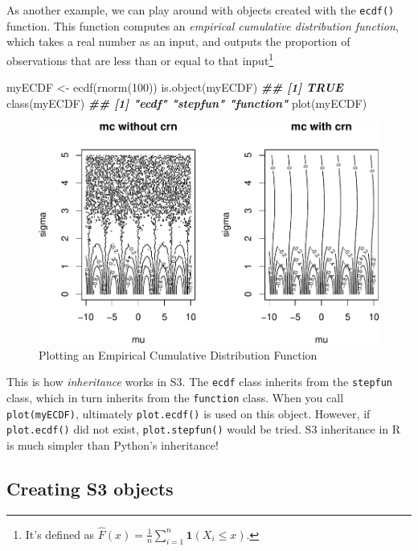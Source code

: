 \documentclass[
  12pt,
  krantz2]{krantz}
\makeatletter
\newenvironment{Shaded}{\begin{snugshade}}{\end{snugshade}}
\newcommand{\DecValTok}[1]{\textcolor[rgb]{0.06,0.06,0.06}{#1}}
\newcommand{\DocumentationTok}[1]{\textcolor[rgb]{0.37,0.37,0.37}{\textbf{\textit{#1}}}}
\newcommand{\FunctionTok}[1]{\textcolor[rgb]{0,0,0}{#1}}
\newcommand{\NormalTok}[1]{#1}
\newcommand{\OtherTok}[1]{\textcolor[rgb]{0.37,0.37,0.37}{#1}}
\newenvironment{kframe}{%
\medskip{}
\setlength{\fboxsep}{.8em}
 \def\at@end@of@kframe{}%
 \ifinner\ifhmode%
  \def\at@end@of@kframe{\end{minipage}}%
  \begin{minipage}{\columnwidth}%
 \fi\fi%
 \def\FrameCommand##1{\hskip\@totalleftmargin \hskip-\fboxsep
 \colorbox{shadecolor}{##1}\hskip-\fboxsep
     \hskip-\linewidth \hskip-\@totalleftmargin \hskip\columnwidth}%
 \MakeFramed {\advance\hsize-\width
   \@totalleftmargin\z@ \linewidth\hsize
   \@setminipage}}%
 {\par\unskip\endMakeFramed%
 \at@end@of@kframe}
\renewenvironment{Shaded}{\begin{kframe}}{\end{kframe}}
\makeatother
\begin{document}
As another example, we can play around with objects created with the \texttt{ecdf()} function. This function computes an \emph{empirical cumulative distribution function}, which takes a real number as an input, and outputs the proportion of observations that are less than or equal to that input\footnote{It's defined as \(\hat{F}(x) = \frac{1}{n}\sum_{i=1}^n \mathbf{1}(X_i \le x)\).}

\begin{Shaded}
\begin{Highlighting}[]
\NormalTok{myECDF }\OtherTok{\textless{}{-}} \FunctionTok{ecdf}\NormalTok{(}\FunctionTok{rnorm}\NormalTok{(}\DecValTok{100}\NormalTok{))}
\FunctionTok{is.object}\NormalTok{(myECDF)}
\DocumentationTok{\#\# [1] TRUE}
\FunctionTok{class}\NormalTok{(myECDF)}
\DocumentationTok{\#\# [1] "ecdf"     "stepfun"  "function"}
\FunctionTok{plot}\NormalTok{(myECDF)}
\end{Highlighting}
\end{Shaded}

\begin{figure}

{\centering \includegraphics[width=0.5\linewidth]{r_and_python_book_files/figure-latex/unnamed-chunk-245-1} 

}

\caption{Plotting an Empirical Cumulative Distribution Function}\label{fig:unnamed-chunk-245}
\end{figure}

This is how \emph{inheritance} works in S3. The \texttt{ecdf} class inherits from the \texttt{stepfun} class, which in turn inherits from the \texttt{function} class. When you call \texttt{plot(myECDF)}, ultimately \texttt{plot.ecdf()} is used on this object. However, if \texttt{plot.ecdf()} did not exist, \texttt{plot.stepfun()} would be tried. S3 inheritance in R is much simpler than Python's inheritance!

\hypertarget{creating-s3-objects}{%
\subsection{Creating S3 objects}\label{creating-s3-objects}}
\end{document}
